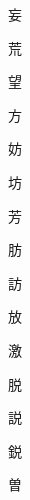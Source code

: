 \begin{spacing}{2.5}
{\Huge \begin{CJK}{UTF8}{min} 妄\end{CJK}}\hspace{0.1cm}
{\Huge \begin{CJK}{UTF8}{min} 荒\end{CJK}}\hspace{0.1cm}
{\Huge \begin{CJK}{UTF8}{min} 望\end{CJK}}\hspace{0.1cm}
{\Huge \begin{CJK}{UTF8}{min} 方\end{CJK}}\hspace{0.1cm}
{\Huge \begin{CJK}{UTF8}{min} 妨\end{CJK}}\hspace{0.1cm}
{\Huge \begin{CJK}{UTF8}{min} 坊\end{CJK}}\hspace{0.1cm}
{\Huge \begin{CJK}{UTF8}{min} 芳\end{CJK}}\hspace{0.1cm}
{\Huge \begin{CJK}{UTF8}{min} 肪\end{CJK}}\hspace{0.1cm}
{\Huge \begin{CJK}{UTF8}{min} 訪\end{CJK}}\hspace{0.1cm}
{\Huge \begin{CJK}{UTF8}{min} 放\end{CJK}}\hspace{0.1cm}
{\Huge \begin{CJK}{UTF8}{min} 激\end{CJK}}\hspace{0.1cm}
{\Huge \begin{CJK}{UTF8}{min} 脱\end{CJK}}\hspace{0.1cm}
{\Huge \begin{CJK}{UTF8}{min} 説\end{CJK}}\hspace{0.1cm}
{\Huge \begin{CJK}{UTF8}{min} 鋭\end{CJK}}\hspace{0.1cm}
{\Huge \begin{CJK}{UTF8}{min} 曽\end{CJK}}\hspace{0.1cm}
\end{spacing}
